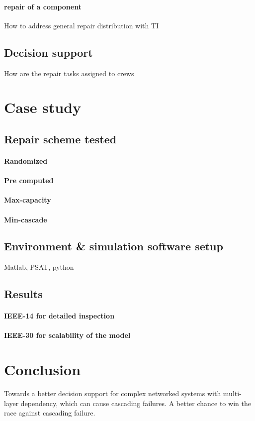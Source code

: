 \documentclass[runningheads]{llncs}
\begin{document}
\paragraph{repair of a component}
    How to address general repair distribution with TI
\subsection{Decision support}
How are the repair tasks assigned to crews

\section{Case study}
\subsection{Repair scheme tested}
\paragraph{Randomized}
\paragraph{Pre computed}
\paragraph{Max-capacity}
\paragraph{Min-cascade}

\subsection{ Environment \& simulation software setup }
Matlab, PSAT, python
\subsection{Results}
\paragraph{IEEE-14 for detailed inspection}
\paragraph{IEEE-30 for scalability of the model}
\section{Conclusion}
Towards a better decision support for complex networked systems with multi-layer dependency, which can cause cascading failures. A better chance to win the race against cascading failure.
\end{document}
